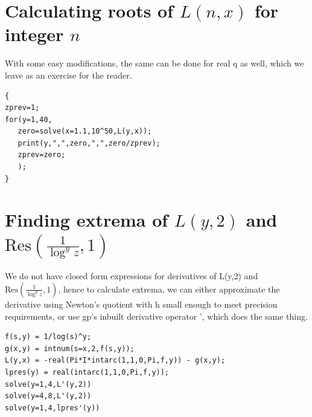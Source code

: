 \documentclass[a4paper,11pt,twoside]{amsart}
\newcommand\Res{\mathrm{Res}}
\begin{document}
\section{Calculating roots of $L(n,x)$ for integer $n$}
With some easy modifications, the same can be done for real q as well, which we leave as an exercise for the reader.

\begin{verbatim}
{
zprev=1;
for(y=1,40,
   zero=solve(x=1.1,10^50,L(y,x));
   print(y,",",zero,",",zero/zprev);
   zprev=zero;
   );
}   
\end{verbatim}

\section{Finding extrema of $L(y,2)$ and $\Res\left(\frac{1}{\log^{y} z}, 1\right)$}
We do not have closed form expressions for derivatives of L(y,2) and $\Res(\frac{1}{\log^{y} z}, 1)$, hence to calculate extrema, we can either approximate the derivative using Newton's quotient with h small enough to meet precision requirements, or use gp's inbuilt derivative operator ', which does the same thing.

\begin{verbatim}
f(s,y) = 1/log(s)^y;
g(x,y) = intnum(s=x,2,f(s,y));
L(y,x) = -real(Pi*I*intarc(1,1,0,Pi,f,y)) - g(x,y);
lpres(y) = real(intarc(1,1,0,Pi,f,y));
solve(y=1,4,L'(y,2))
solve(y=4,8,L'(y,2))
solve(y=1,4,lpres'(y))
\end{verbatim}
\end{document}
